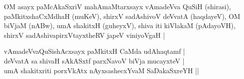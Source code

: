 \begin{entry}
\medskip
\begin{shl}
OM asayx paMcAkaSxriV mahAmaMtarxsayx vAmadeVva QuSiH (shirasi), paMkitxshaCxMdhaH
(muKeV), shirxV sadAshivoV deVvatA (haqdayeV), OM biVjaM (nABw), umA shakitxH (guheyxV), shiva
iti kiVlakaM (pAdayoVH), shirxV sadAshivapirxVtayxtheRV japeV viniyoVgaH |
\end{shl}
\medskip
\begin{shl}
vAmadeVvaQuSishAcxsayx paMkitxH CaMda udAhaqtamf |\\[1pt]
deVvatA sa shivaH sAkASxtf parxNavoV biVja mucayxteV |\\[1pt]
umA shakitxriti porxVkAtx nAyxsashecxYvaM SaDakaSxreYH ||
\end{shl}
\medskip
{}
\medskip
\end{entry}

